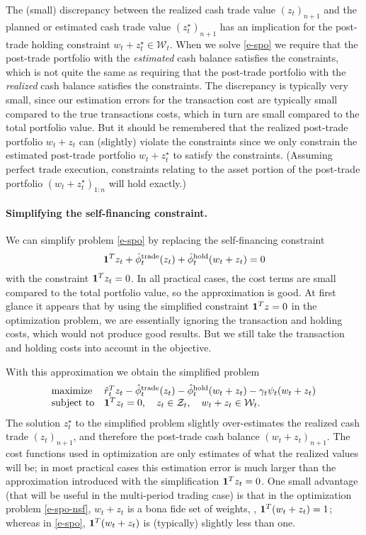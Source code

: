 \documentclass[openany]{now}
\newcommand{\trcosthat}{\hat \phi^\mathrm{trade}}
\newcommand{\hldcosthat}{\hat \phi^\mathrm{hold}}
\begin{document}
The (small) discrepancy between the realized cash trade value $(z_t)_{n+1}$ and
the planned or estimated cash trade value $(z_t^\star)_{n+1}$
has an implication for the post-trade holding
constraint $w_t+z_t^\star \in \mathcal W_t$.  When we solve \eqref{e-spo}
we require that the post-trade portfolio with the \emph{estimated}
cash balance satisfies
the constraints, which is not quite the same as requiring that
the post-trade portfolio with the \emph{realized} cash balance satisfies
the constraints.  The discrepancy is typically very small, since our estimation
errors for the transaction cost are typically small compared to the
true transactions costs, which in turn are small compared to
the total portfolio value.
But it should be remembered that the realized post-trade portfolio
$w_t + z_t$ can (slightly) violate the constraints since we only constrain
the estimated post-trade portfolio $w_t + z_t^\star$ to satisfy the constraints.
(Assuming perfect trade execution, constraints relating to the
asset portion of the post-trade portfolio
$(w_t+z_t^\star)_{1:n}$ will hold exactly.)

\paragraph{Simplifying the self-financing constraint.}
We can simplify problem \eqref{e-spo} by replacing the self-financing constraint
\[
\ones^Tz_t + \trcosthat_t (z_t) + \hldcosthat_t (w_t + z_t) = 0
\]
with the constraint $\mathbf 1^Tz_t = 0$.
In all practical cases, the cost terms are small compared to the total portfolio
value, so the approximation is good.
At first glance it appears that by using the simplified constraint $\mathbf 1^Tz=0$
in the optimization problem, we are essentially ignoring the transaction
and holding costs, which
would not produce good results.
But we still take the transaction and holding costs into account in the objective.

With this approximation we obtain the simplified problem
\begin{equation}\label{e-spo-nsf}
\begin{array}{ll}
\mbox{maximize} &
\hat r_t^T z_t
- \trcosthat_t (z_t) - \hldcosthat_t (w_t + z_t)
-\gamma_t \psi_t(w_t+z_t)\\
\mbox{subject to} &
\ones^Tz_t = 0, \quad z_t \in \mathcal Z_t, \quad
w_t + z_t \in \mathcal W_t.
\end{array}
\end{equation}
The solution $z_t^\star$ to the simplified problem
slightly over-estimates the realized cash trade $(z_t)_{n+1}$,
and therefore the post-trade cash balance $(w_t+z_t)_{n+1}$.
The cost functions used
in optimization are only estimates of what the realized values will be;
in most practical cases this estimation error is much larger than
the approximation introduced with the simplification $\mathbf 1^Tz_t=0$.
One small advantage (that will be useful in the multi-period trading case)
is that in the optimization problem \eqref{e-spo-nsf}, $w_t+z_t$ is a bona fide
set of weights, \ie, $\mathbf 1^T(w_t+z_t)=1$;
whereas in \eqref{e-spo},
$\mathbf 1^T(w_t+z_t)$ is (typically) slightly less than one.
\end{document}
